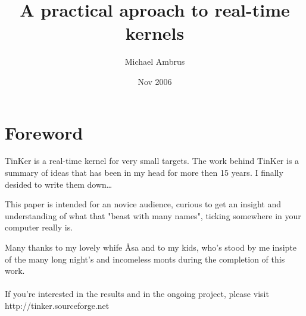 \documentclass[a4paper,10pt]{book}
\begin{document}
\title{A practical aproach to real-time kernels}
\author{Michael Ambrus} 
\date{Nov 2006}
\maketitle


\chapter{Foreword}
\label{FIXME}
	TinKer is a real-time kernel for very small targets. The work behind TinKer is a summary of ideas that has been in my head for more then 15 years. I finally desided to write them down\ldots

	This paper is intended for an novice audience, curious to get an insight and understanding of what that "beast with many names", ticking somewhere in your computer really is.

	Many thanks to my lovely whife \AA sa and to my kids, who's stood by me insipte of the many long night's and incomeless monts during the completion of this work.
\\\\
	If you're interested in the results and in the ongoing project, please visit http://tinker.sourceforge.net

\tableofcontents
\mainmatter

\listoffigures 
\listoftables
\end{document}
